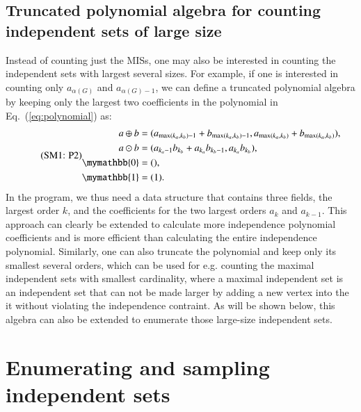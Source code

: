 \documentclass[onefignum, onetabnum]{siamart190516}
\newcommand{\eqname}[1]{\stepcounter{equation}\tag{\theequation : #1}}
\newcommand{\<}{\langle}
\renewcommand{\>}{\rangle}
\newcommand{\Eq}[1]{Eq.~(\ref{#1})}
\newcounter{example}
\begin{document}
\subsection{Truncated polynomial algebra for counting independent sets of large size}
Instead of counting just the MISs, one may also be interested in counting the independent sets with largest several sizes.
For example, if one is interested in counting only $a_{\alpha(G)}$ and $a_{\alpha(G)-1}$, we can define a truncated polynomial algebra by keeping only the largest two coefficients in the polynomial in \Eq{eq:polynomial} as:
\begin{equation}
    \eqname{P2}
    \begin{split}
    a \oplus b &= (a_{\max(k_a, k_b)-1} + b_{\max(k_a, k_b)-1}, a_{\max(k_a, k_b)} + b_{\max(k_a, k_b)}),\\
    a \odot b &= (a_{k_a-1} b_{k_b}+a_{k_a} b_{k_b-1}, a_{k_a} b_{k_b}),\\
    \mymathbb{0} &= (), \\
    \mymathbb{1} &= (1).\label{eq:max2poly}
    \end{split}
\end{equation}
In the program, we thus need a data structure that contains three fields, the largest order $k$, and the coefficients for the two largest orders $a_k$ and $a_{k-1}$.
This approach can clearly be extended to calculate more independence polynomial coefficients and is more efficient than calculating the entire independence polynomial.
Similarly, one can also truncate the polynomial and keep only its smallest several orders,
which can be used for e.g. counting the maximal independent sets with smallest cardinality,
where a maximal independent set is an independent set that can not be made larger by adding a new vertex into the it without violating the independence contraint.
As will be shown below, this algebra can also be extended to enumerate those large-size independent sets.

\section{Enumerating and sampling independent sets}\label{sec:enumeration}
\end{document}
